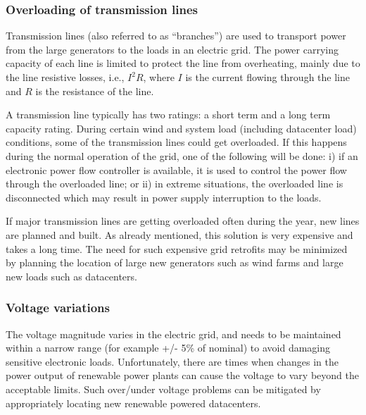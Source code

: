\subsubsection{Overloading of transmission lines}
Transmission lines (also referred to as ``branches'') are used to
transport power from the large generators to the loads in an electric
grid. The power carrying capacity of each line is limited to protect
the line from overheating, mainly due to the line resistive losses,
i.e., $I^{2}R$, where $I$ is the current flowing through the line and
$R$ is the resistance of the line.

A transmission line typically has two ratings: a short term and a long
term capacity rating. During certain wind and system load (including
datacenter load) conditions, some of the transmission lines could get
overloaded. If this happens during the normal operation of the grid,
one of the following will be done: i) if an electronic power flow
controller is available, it is used to control the power flow
through the overloaded line; or ii) in extreme situations, the
overloaded line is disconnected which may result in power supply
interruption to the loads.

If major transmission lines are getting overloaded often during the
year, new lines are planned and built.  As already mentioned,
this solution is very expensive and takes a long time. The need for
such expensive grid retrofits may be minimized by planning the
location of large new generators such as wind farms and large new
loads such as datacenters.

\subsubsection{Voltage variations}
The voltage magnitude varies in the electric grid, and needs to be maintained within a narrow range (for example +/- 5\% of nominal) to avoid damaging sensitive electronic loads.  Unfortunately, there are times when changes in the power output of renewable power plants can cause the voltage to vary beyond the acceptable limits. Such over/under voltage problems can be mitigated by appropriately locating new renewable powered datacenters.

